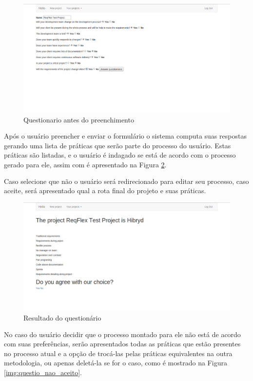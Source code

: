 \begin{figure}[H]
	\centering
	\includegraphics[scale=0.3]{imgFerramenta/questionarioPreenchido}
	\caption{Questionario antes do preenchimento}
	\label{img:questionario_depois}
\end{figure}

Após o usuário preencher e enviar o formulário o sistema computa suas respostas gerando uma lista de práticas que serão parte do processo do usuário. Estas práticas são listadas, e o usuário é indagado se está de acordo com o processo gerado para ele, assim com é apresentado na Figura \ref{img:result_questionario}.

Caso selecione que não o usuário será redirecionado para editar seu processo, caso aceite, será apresentado qual a rota final do projeto e suas práticas.

\begin{figure}[H]
	\centering
	\includegraphics[scale=0.3]{imgFerramenta/resultadoQuestionario}
	\caption{Resultado do questionário}
	\label{img:result_questionario}
\end{figure}

No caso do usuário decidir que o processo montado para ele não está de acordo com suas preferências, serão apresentados todas as práticas que estão presentes no processo atual e a opção de trocá-las pelas práticas equivalentes na outra metodologia, ou apenas deletá-la se for o caso, como é mostrado na Figura \ref{img:questio_nao_aceito}.

